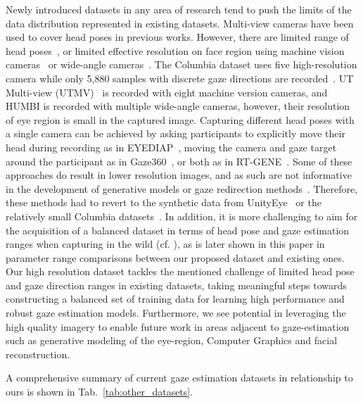 \documentclass[runningheads]{llncs}
\begin{document}
Newly introduced datasets in any area of research tend to push the limits of the data distribution represented in existing datasets.
Multi-view cameras have been used to cover head poses in previous works.
However, there are limited range of head poses~\cite{smith2013gaze}, or limited effective resolution on face region using machine vision cameras~\cite{sugano2014learning} or wide-angle cameras~\cite{yu2020humbi}.
The Columbia dataset uses five high-resolution camera while only 5,880 samples with discrete gaze directions are recorded~\cite{smith2013gaze}.
UT Multi-view (UTMV)~\cite{sugano2014learning} is recorded with eight machine version cameras, and HUMBI is recorded with multiple wide-angle cameras, however, their resolution of eye region is small in the captured image.
Capturing different head poses with a single camera can be achieved by asking participants to explicitly move their head during recording as in EYEDIAP~\cite{funes2014eyediap}, moving the camera and gaze target around the participant as in Gaze360~\cite{kellnhofer2019gaze360}, or both as in RT-GENE~\cite{fischer2018rt}.
Some of these approaches do result in lower resolution images, and as such are not informative in the development of generative models \cite{shrivastava2017learning} or gaze redirection methods~\cite{He_2019_ICCV,yu2019improving}. Therefore, these methods had to revert to the synthetic data from UnityEye~\cite{wood2016_etra} or the relatively small Columbia datasets~\cite{smith2013gaze}.
In addition, it is more challenging to aim for the acquisition of a balanced dataset in terms of head pose and gaze estimation ranges when capturing in the wild (cf. \cite{zhang2019mpiigaze,krafka2016eye,kellnhofer2019gaze360}), as is later shown in this paper in parameter range comparisons between our proposed dataset and existing ones.
Our high resolution dataset tackles the mentioned challenge of limited head pose and gaze direction ranges in existing datasets, taking meaningful steps towards constructing a balanced set of training data for learning high performance and robust gaze estimation models. Furthermore, we see potential in leveraging the high quality imagery to enable future work in areas adjacent to gaze-estimation such as generative modeling of the eye-region, Computer Graphics and facial reconstruction. 



A comprehensive summary of current gaze estimation datasets in relationship to ours is shown in Tab.~\ref{tab:other_datasets}. 
\end{document}
